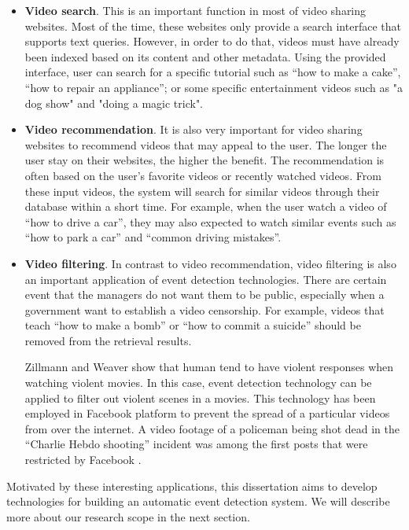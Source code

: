 \begin{itemize}
	\item \textbf{Video search}. This is an important function in most of video sharing websites. Most of the time, these websites only provide a search interface that supports text queries. However, in order to do that, videos must have already been indexed based on its content and other metadata. Using the provided interface, user can search for a specific tutorial such as ``how to make a cake'',  ``how to repair an appliance''; or some specific entertainment videos such as "a dog show" and "doing a magic trick".
	\item \textbf{Video recommendation}. It is also very important for video sharing websites to recommend videos that may appeal to the user. The longer the user stay on their websites, the higher the benefit. The recommendation is often based on the user's favorite videos or recently watched videos. From these input videos, the system will search for similar videos through their database within a short time. For example, when the user watch a video of ``how to drive a car'', they may also expected to watch similar events such as ``how to park a car'' and ``common driving mistakes''.
	\item \textbf{Video filtering}. In contrast to video recommendation, video filtering is also an important application of event detection technologies. There are certain event that the managers do not want them to be public, especially when a government want to establish a video censorship. For example, videos that teach ``how to make a bomb'' or ``how to commit a suicide'' should be removed from the retrieval results. 

	Zillmann and Weaver \cite{JASP:JASP145} show that human tend to have violent responses when watching violent movies. In this case, event detection technology can be applied to filter out violent scenes in a movies. This technology has been employed in Facebook platform \cite{Internet3} to prevent the spread of a particular videos from over the internet. A video footage of a policeman being shot dead in the ``Charlie Hebdo shooting'' incident was among the first posts that were restricted by Facebook \cite{Internet3}. 
	
\end{itemize}

Motivated by these interesting applications, this dissertation aims to develop technologies for building an automatic event detection system. We will describe more about our research scope in the next section.

